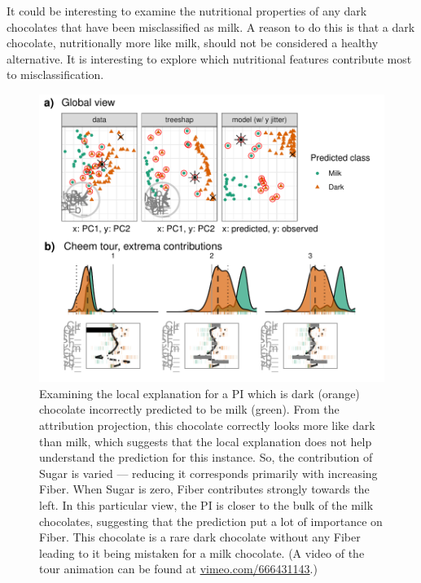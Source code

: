 \documentclass[
]{article}
\begin{document}
It could be interesting to examine the nutritional properties of any dark chocolates that have been misclassified as milk. A reason to do this is that a dark chocolate, nutritionally more like milk, should not be considered a healthy alternative. It is interesting to explore which nutritional features contribute most to misclassification.



\begin{figure}

{\centering \includegraphics[width=1\linewidth]{./figures/case_chocolates} 

}

\caption{Examining the local explanation for a PI which is dark (orange) chocolate incorrectly predicted to be milk (green). From the attribution projection, this chocolate correctly looks more like dark than milk, which suggests that the local explanation does not help understand the prediction for this instance. So, the contribution of Sugar is varied --- reducing it corresponds primarily with increasing Fiber. When Sugar is zero, Fiber contributes strongly towards the left. In this particular view, the PI is closer to the bulk of the milk chocolates, suggesting that the prediction put a lot of importance on Fiber. This chocolate is a rare dark chocolate without any Fiber leading to it being mistaken for a milk chocolate. (A video of the tour animation can be found at \href{https://vimeo.com/666431143}{vimeo.com/666431143}.)}\label{fig:casechocolates}
\end{figure}
\end{document}

